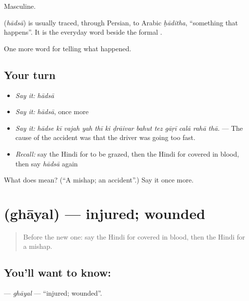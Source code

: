 Masculine.

\begin{cousinweb}
\textbf{} (\emph{hādsā}) is usually traced, through Persian, to Arabic \emph{ḥāditha}, \textquotedblleft{}something that happens\textquotedblright{}. It is the everyday word beside the formal \textbf{}.
\end{cousinweb}

\begin{grammarlens}[title={What you've built}]
One more word for telling what happened.
\end{grammarlens}

\subsection*{Your turn}
\begin{itemize}
\raggedright
  \item \emph{Say it:} \emph{hādsā}
  \item \emph{Say it:} \emph{hādsā}, once more
  \item \emph{Say it:} \emph{hādse kī vajah yah thī ki ḍrāivar bahut tez gāṛī calā rahā thā.} — The cause of the accident was that the driver was going too fast.
  \item \emph{Recall:} say the Hindi for to be grazed, then the Hindi for covered in blood, then say \emph{hādsā} again
\end{itemize}

\begin{tcolorbox}[breakable,colback=teal!4,colframe=teal!35!black,title={Before you move on}]
What does  mean? (\textquotedblleft{}A mishap; an accident\textquotedblright{}.) Say it once more.
\end{tcolorbox}
\section[\texorpdfstring{\hi{घायल} (ghāyal)}{घायल (ghāyal)}]{ (ghāyal) — injured; wounded}

\label{lesson:HI-C298-ghayal}



\begin{quote}
Before the new one: say the Hindi for covered in blood, then the Hindi for a mishap.
\end{quote}

\subsection*{You'll want to know: }
\textbf{} — \emph{ghāyal} — \textquotedblleft{}injured; wounded\textquotedblright{}.

